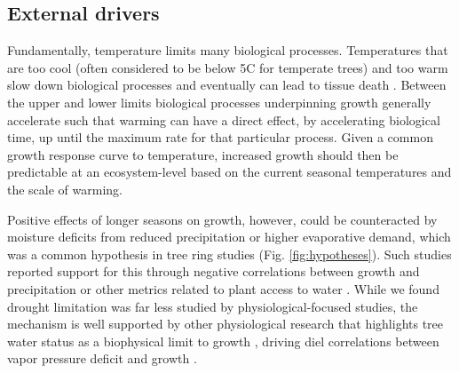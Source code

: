 \documentclass[11pt]{article}
\begin{document}
\subsection*{External drivers}

Fundamentally, temperature limits many biological processes. Temperatures that are too cool (often considered to be below 5\degree C for temperate trees) and too warm \citep[an area of active research,][]{martinez2008hot,cabon2022cross} slow down biological processes and eventually can lead to tissue death \citep[see Fig. \ref{fig:temperaturecomplex},][]{larcher1980,kramer2012book}. Between the upper and lower limits biological processes underpinning growth generally accelerate such that warming can have a direct effect,  by accelerating biological time, up until the maximum rate for that particular process. Given a common growth response curve to temperature, increased growth should then be predictable at an ecosystem-level based on the current seasonal temperatures and the scale of warming. 

Positive effects of longer seasons on growth, however, could be counteracted by moisture deficits from reduced precipitation or higher evaporative demand, which was a common hypothesis in tree ring studies (Fig. \ref{fig:hypotheses}). Such studies reported support for this through negative correlations between growth and precipitation or other metrics related to plant access to water \citep{george2014overview,babst2019twentieth}. While we found drought limitation was far less studied by physiological-focused studies, the mechanism is well supported by other physiological research that highlights tree water status as a biophysical limit to growth \citep[i.e., cells cannot expand without sufficient turgor,][]{peters2021turgor,cosgrove2023structure}, driving diel correlations between vapor pressure deficit and growth \citep{babst2019twentieth,zweifel2021trees}.
\end{document}
